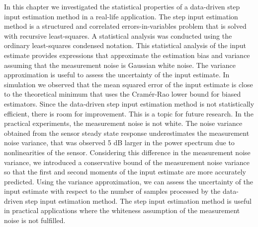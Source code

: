 In this chapter we investigated the statistical properties of a data-driven step input estimation method in a real-life application.
The step input estimation method is a structured and correlated errors-in-variables problem that is solved with recursive least-squares.
A statistical analysis was conducted using the ordinary least-squares condensed notation. 
This statistical analysis of the input estimate provides expressions that approximate the estimation bias and variance assuming that the measurement noise is Gaussian white noise. 
The variance approximation is useful to assess the uncertainty of the input estimate.
In simulation we observed that the mean squared error of the input estimate is close to the theoretical minimum that uses the Cram\'er-Rao lower bound for biased estimators.
Since the data-driven step input estimation method is not statistically efficient, there is room for improvement. This is a topic for future research.
In the practical experiments, the measurement noise is not white.
The noise variance obtained from the sensor steady state response underestimates the measurement noise variance, that was observed 5 dB larger in the power spectrum due to nonlinearities of the sensor.
Considering this difference in the measurement noise variance, we introduced a conservative bound of the measurement noise variance so that the first and second moments of the input estimate are more accurately predicted.
Using the variance approximation, we can assess the uncertainty of the input estimate with respect to the number of samples processed by the data-driven step input estimation method.
The step input estimation method is useful in practical applications where the whiteness assumption of the measurement noise is not fulfilled. 


